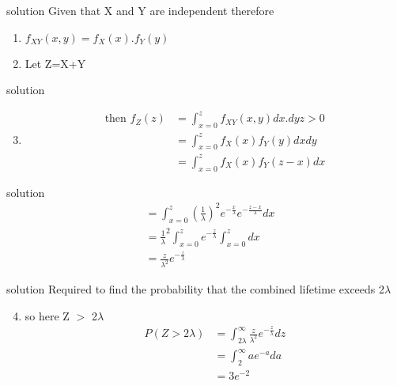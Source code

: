 \documentclass{beamer}
\begin{document}
     
\begin{frame}{solution}
Given that X and Y are independent therefore
\begin{enumerate}
    \item $f_{XY}(x,y) = f_{X}(x).f_{Y}(y)$
    \item Let Z=X+Y
\end{enumerate}
\end{frame}


\begin{frame}{solution}
\begin{enumerate}
\setcounter{enumi}{2}

\item 
\begin{align}
    \text{then }f_{Z}(z) & = \int_{x=0}^{z}f_{XY}(x,y)dx.dy{      z>0}\\
                         & = \int_{x=0}^{z}f_{X}(x)f_{Y}(y)dxdy\\
                         & = \int_{x=0}^{z}f_{X}(x)f_{Y}(z-x)dx
\end{align}
\end{enumerate}
\end{frame}


\begin{frame}{solution}
\begin{align}
                         & = \int_{x=0}^{z}({\frac{1}{\lambda}})^2e^{-\frac{x}{\lambda}}e^{-\frac{z-x}{\lambda}}dx\\ 
                         & = {\frac{1}{\lambda}}^2\int_{x=0}^{z}e^{-\frac{z}{\lambda}}\int_{x=0}^{z}dx\\
                         & = {\frac{z}{{\lambda}^2}}e^{-\frac{z}{\lambda}}
\end{align}

\end{frame}
     
     
\begin{frame}{solution}
Required to find the probability that the combined lifetime exceeds 2$\lambda$
\begin{enumerate}
\setcounter{enumi}{3}
\item so here Z $>$ 2$\lambda$
\begin{align}
     P(Z>2\lambda) & = \int_{2\lambda}^{\infty}{\frac{z}{{\lambda}^2}}e^{-\frac{z}{\lambda}}dz\\
                   & = \int_{2}^{\infty}ae^{-a}da\\
                   & = 3e^{-2}
    \end{align}
    \end{enumerate}
    \end{frame}
    
\end{document}
